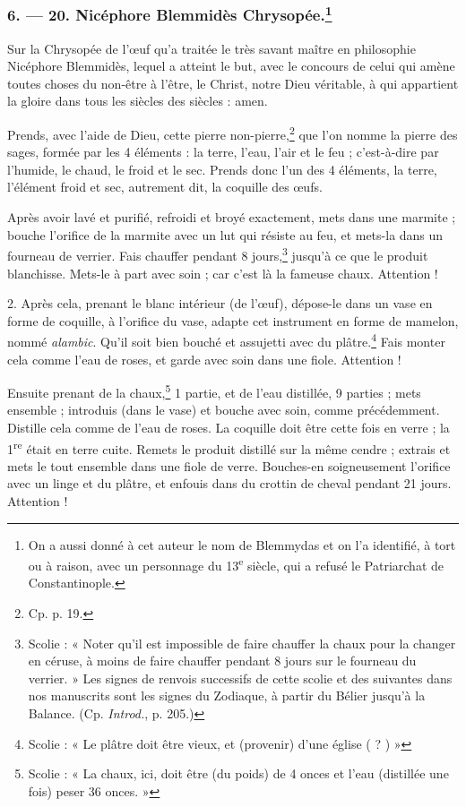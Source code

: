 \documentclass[a4paper, 11pt, oneside, polutonikogreek, french]{article}
\begin{document}
\subsubsection[6. --- 20. Nicéphore Blemmidès Chrysopée.]{6. --- 20. Nicéphore Blemmidès Chrysopée.\footnote{On a aussi donné à cet auteur le nom de Blemmydas et on l'a identifié, à tort ou à raison, avec un personnage du 13\textsuperscript{e} siècle, qui a refusé le Patriarchat de Constantinople.}}

Sur la Chrysopée de l'œuf qu'a traitée le très savant maître en philosophie Nicéphore Blemmidès, lequel a atteint le but, avec le concours de celui qui amène toutes choses du non-être à l'être, le Christ, notre Dieu véritable, à qui appartient la gloire dans tous les siècles des siècles : amen.

Prends, avec l'aide de Dieu, cette pierre non-pierre,\footnote{Cp. p. 19.} que l'on nomme la pierre des sages, formée par les 4 éléments : la terre, l'eau, l'air et le feu ; c'est-à-dire par l'humide, le chaud, le froid et le sec. Prends donc l'un des 4 éléments, la terre, l'élément froid et sec, autrement dit, la coquille des œufs.

Après avoir lavé et purifié, refroidi et broyé exactement, mets dans une marmite ; bouche l'orifice de la marmite avec un lut qui résiste au feu, et mets-la dans un fourneau de verrier. Fais chauffer pendant 8 jours,\footnote{Scolie : « Noter qu'il est impossible de faire chauffer la chaux pour la changer en céruse, à moins de faire chauffer pendant 8 jours sur le fourneau du verrier. » Les signes de renvois successifs de cette scolie et des suivantes dans nos manuscrits sont les signes du Zodiaque, à partir du Bélier jusqu'à la Balance. (Cp. \emph{Introd.}, p. 205.)} jusqu'à ce que le produit blanchisse. Mets-le à part avec soin ; car c'est là la fameuse chaux. Attention !

2. Après cela, prenant le blanc intérieur (de l'œuf), dépose-le dans un vase en forme de coquille, à l'orifice du vase, adapte cet instrument en forme de mamelon, nommé \emph{alambic}. Qu'il soit bien bouché et assujetti avec du plâtre.\footnote{Scolie : « Le plâtre doit être vieux, et (provenir) d'une église ( ? ) »} Fais monter cela comme l'eau de roses, et garde avec soin dans une fiole. Attention !

Ensuite prenant de la chaux,\footnote{Scolie : « La chaux, ici, doit être (du poids) de 4 onces et l'eau (distillée une fois) peser 36 onces. »} 1 partie, et de l'eau distillée, 9 parties ; mets ensemble ; introduis (dans le vase) et bouche avec soin, comme précédemment. Distille cela comme de l'eau de roses. La coquille doit être cette fois en verre ; la 1\textsuperscript{re} était en terre cuite. Remets le produit distillé sur la même cendre ; extrais et mets le tout ensemble dans une fiole de verre. Bouches-en soigneusement l'orifice avec un linge et du plâtre, et enfouis dans du crottin de cheval pendant 21 jours. Attention !
\end{document}
